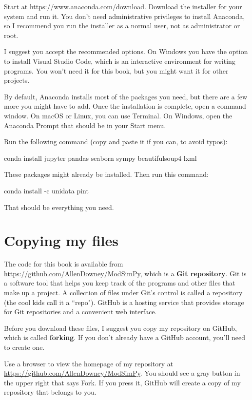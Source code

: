 \documentclass[12pt]{book}
\theoremstyle{exercise}
\begin{document}
Start at \url{https://www.anaconda.com/download}.  Download the installer for your system and run it.  You don't need administrative privileges to install Anaconda, so I recommend you run the installer as a normal user, not as administrator or root.

I suggest you accept the recommended options.
On Windows you have the option to install Visual Studio Code, which is an interactive environment for writing programs.  You won't need it for this book, but you might want it for other projects.

By default, Anaconda installs most of the packages you need, but there are a few more you might have to add.  Once the installation is complete, open a command window.  On macOS or Linux, you can use Terminal.  On Windows, open the Anaconda Prompt that should be in your Start menu.

Run the following command (copy and paste it if you can, to avoid typos):

\begin{code}
conda install jupyter pandas seaborn sympy beautifulsoup4 lxml
\end{code}

These packages might already be installed.  Then run this command:

\begin{code}
conda install -c unidata pint
\end{code}

That should be everything you need.


\section{Copying my files}

The code for this book is available from
\url{https://github.com/AllenDowney/ModSimPy}, which is a {\bf Git repository}.  Git is a software tool that helps you keep track of the programs and other files that make up a project.  A collection of files under Git's control is called a repository (the cool kids call it a ``repo").  GitHub is a hosting service that provides storage for Git repositories and a convenient web interface.


Before you download these files, I suggest you copy my repository on GitHub, which is called {\bf forking}.  If you don't already have a GitHub account, you'll need to create one.  

Use a browser to view the homepage of my repository at \url{https://github.com/AllenDowney/ModSimPy}.   You should see a gray button in the upper right that says {\sf Fork}.  If you press it, GitHub will create a copy of my repository that belongs to you.
\end{document}
